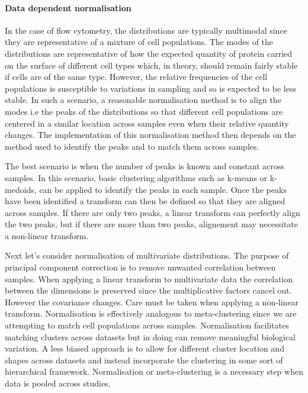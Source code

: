 \paragraph{Data dependent normalisation}

In the case of flow cytometry, the distributions are typically multimodal since they are representative of a mixture of cell populations.
The modes of the distributions are representative of how the expected quantity of protein carried on the surface of different cell types which,
in theory, should remain fairly stable if cells are of the same type.
However, the relative frequencies of the cell populations is susceptible to variations in sampling and so is expected to be less stable.
In such a scenario, a reasonable normalisation method is to align the modes i.e the peaks of the distributions so that different cell populations are centered
in a similar location across samples even when their relative quantity changes.
The implementation of this normalisation method then depends on the method used to identify the peaks and to match them across samples.

The best scenario is when the number of peaks is known and constant across samples.
In this scenario, basic clustering algorithms such as k-means or k-medoids, can be applied to identify the peaks in each sample.
Once the peaks have been identified a transform can then be defined so that they are aligned across samples.
If there are only two peaks, a linear transform can perfectly align the two peaks, but if there are more than two peaks, alignement may necessitate a non-linear transform.

Next let's consider normalisation of multivariate distributions.  
The purpose of principal component correction is to remove unwanted correlation between samples.
When applying a linear transform to multivariate data the correlation between the dimensions is preserved since the multiplicative factors cancel out.
However the covariance changes.
Care must be taken when applying a non-linear transform.  
Normalisation is effectively analogous to meta-clustering since we are attempting to match cell populations across samples.  
Normalisation facilitates matching clusters across datasets but in doing can remove meaningful biological variation.  
A less biased approach is to allow for different cluster location and shapes across datasets and instead incorporate the clustering in some sort of hierarchical framework.  
Normalisation or meta-clustering is a necessary step when data is pooled across studies.




